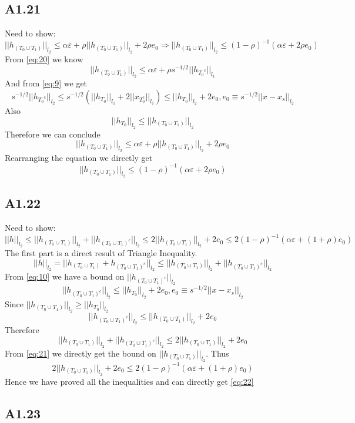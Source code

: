 \documentclass{article}
\newcommand{\lone}[1]{
  ||#1||_{l_1}
}
\newcommand{\ltwo}[1]{
  ||#1||_{l_2}
}
\newcommand{\htc}[1]{
  h_{{#1}^c}
}
\newcommand{\hto}[1]{
  h_{#1}
}
\newcommand{\htzo}{
  h_{(T_0 \cup T_1)}
}
\newcommand{\htzoc}{
  h_{(T_0 \cup T_1)^c}
}
\begin{document}
\subsection*{A1.21}
Need to show:
\begin{equation}
  \label{eq:21}
  \ltwo{\htzo} \le \alpha \varepsilon + \rho \ltwo{\htzo} + 2\rho e_0 \Rightarrow \ltwo{\htzo} \le (1-\rho)^{-1}(\alpha \varepsilon + 2\rho e_0)
\end{equation}
From \ref{eq:20} we know
$$\ltwo{\htzo} \le \alpha \varepsilon + \rho s^{-1/2}\lone{\htc{T_0}}$$
And from \ref{eq:9} we get
$$ s^{-1/2} \ltwo{\htc{T_0}} \le s^{-1/2}(\lone{\hto{T_0}} + 2\lone{x_{T_0^c}}) \le \ltwo{\hto{T_0}} + 2e_0, e_0 \equiv s^{-1/2}\ltwo{x-x_s}$$
Also
$$\ltwo{\hto{T_0}} \le \ltwo{\htzo}$$
Therefore we can conclude
$$\ltwo{\htzo} \le \alpha \varepsilon + \rho \ltwo{\htzo} + 2\rho e_0$$
Rearranging the equation we directly get 
$$\ltwo{\htzo} \le (1-\rho)^{-1}(\alpha \varepsilon + 2\rho e_0)$$
\subsection*{A1.22}
Need to show:
\begin{equation}
  \label{eq:22}
  \ltwo{h} \le \ltwo{\htzo} + \ltwo{\htzoc} \le 2\ltwo{\htzo} + 2e_0 \le 2(1-\rho)^{-1}(\alpha\varepsilon + (1+\rho)e_0)
\end{equation}
The first part is a direct result of Triangle Inequality.
$$\ltwo{h} = \ltwo{\htzo + \htzoc} \le \ltwo{\htzo} + \ltwo{\htzoc}$$
From \ref{eq:10} we have a bound on $\ltwo{\htzoc}$
$$\ltwo{\htzoc} \le \ltwo{\hto{T_0}} + 2e_0, e_0 \equiv s^{-1/2}\ltwo{x - x_s}$$
Since $\ltwo{\htzo} \ge \ltwo{\hto{T_0}}$
$$\ltwo{\htzoc} \le \ltwo{\htzo} + 2e_0$$
Therefore
$$\ltwo{\htzo} + \ltwo{\htzoc} \le 2\ltwo{\htzo} + 2e_0$$
From \ref{eq:21} we directly get the bound on $\ltwo{\htzo}$. Thus
$$2\ltwo{\htzo} + 2e_0 \le 2(1-\rho)^{-1}(\alpha\varepsilon + (1+\rho)e_0)$$
Hence we have proved all the inequalities and can directly get \ref{eq:22}

\subsection*{A1.23}
\end{document}
